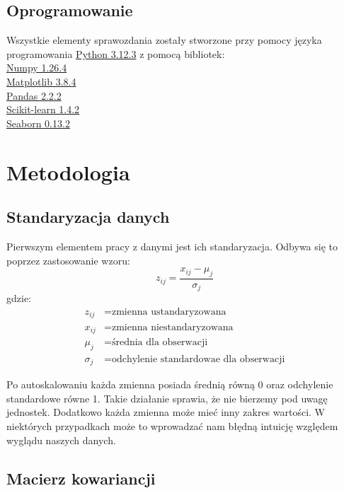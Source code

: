 \documentclass[12pt, a4paper]{article}
\begin{document}
    \subsection{Oprogramowanie}
        Wszystkie elementy sprawozdania zostały stworzone przy pomocy języka programowania \href{https://docs.python.org/3.12/}{Python 3.12.3} z pomocą bibliotek:\\
        \href{https://numpy.org/doc/1.26/}{Numpy 1.26.4}\\
        \href{https://matplotlib.org/3.8.4/index.html}{Matplotlib 3.8.4}\\
        \href{https://pandas.pydata.org/pandas-docs/version/2.2.2/}{Pandas 2.2.2}\\
        \href{https://scikit-learn.org/1.4/index.html}{Scikit-learn 1.4.2}\\
        \href{https://seaborn.pydata.org}{Seaborn 0.13.2}

\section{Metodologia}
    \subsection{Standaryzacja danych}

        Pierwszym elementem pracy z danymi jest ich standaryzacja.
        Odbywa się to poprzez zastosowanie wzoru:
        \begin{equation}
            z_{ij} = \frac{x_{ij} - \mu_j}{\sigma_j}
        \end{equation}
        gdzie:
        \begin{align*}
            z_{ij} &= \text{zmienna ustandaryzowana}\\
            x_{ij} &= \text{zmienna niestandaryzowana}\\
            \mu_j &= \text{średnia dla obserwacji}\\
            \sigma_j &= \text{odchylenie standardowae dla obserwacji}
        \end{align*}

        Po autoskalowaniu każda zmienna posiada średnią równą 0 oraz odchylenie standardowe równe 1.
        Takie działanie sprawia, że nie bierzemy pod uwagę jednostek. Dodatkowo każda zmienna może mieć inny zakres wartości.
        W niektórych przypadkach może to wprowadzać nam błędną intuicję względem wyglądu naszych danych.

    \subsection{Macierz kowariancji}
        \def\CovX{
            \begin{bmatrix}
                Var(x_1) & \hdots & Cov(x_1, x_n)\\
                \vdots & \ddots & \vdots\\
                Cov(x_n, x_1) & \hdots & Var(x_n)
            \end{bmatrix}
        }
        
\end{document}
